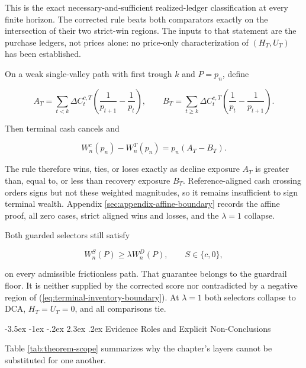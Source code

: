\documentclass[12pt,a4paper,oneside]{report}
\makeatletter
\renewcommand\section{\@startsection{section}{1}{\z@}%
  {-3.5ex \@plus -1ex \@minus -.2ex}%
  {2.3ex \@plus .2ex}%
  {\normalfont\fontsize{14}{17}\selectfont\bfseries}}
\makeatother
\begin{document}
This is the exact necessary-and-sufficient realized-ledger classification at
every finite horizon. The corrected rule beats both comparators exactly on the
intersection of their two strict-win regions. The inputs to that statement are
the purchase ledgers, not prices alone: no price-only characterization of
$(H_T,U_T)$ has been established.

On a weak single-valley path with first trough $k$ and $P=p_n$, define

\begin{equation}
  A_T=\sum_{t<k}\Delta C_t^{c,T}
      \left(\frac1{p_{t+1}}-\frac1{p_t}\right),
  \qquad
  B_T=\sum_{t\geq k}\Delta C_t^{c,T}
      \left(\frac1{p_t}-\frac1{p_{t+1}}\right).
  \label{eq:valley-exposures}
\end{equation}

Then terminal cash cancels and

\begin{equation}
  W_n^c(p_n)-W_n^T(p_n)=p_n(A_T-B_T).
  \label{eq:valley-terminal-boundary}
\end{equation}

The rule therefore wins, ties, or loses exactly as decline exposure $A_T$ is
greater than, equal to, or less than recovery exposure $B_T$. Reference-aligned
cash crossing orders signs but not these weighted magnitudes, so it remains
insufficient to sign terminal wealth. Appendix
\ref{sec:appendix-affine-boundary} records the affine proof, all zero cases,
strict aligned wins and losses, and the $\lambda=1$ collapse.

Both guarded selectors still satisfy

\begin{equation}
  W_n^S(P)\geq\lambda W_n^D(P),\qquad S\in\{c,0\},
  \label{eq:boundary-safety-reminder}
\end{equation}

on every admissible frictionless path. That guarantee belongs to the guardrail
floor. It is neither supplied by the corrected score nor contradicted by a
negative region of (\ref{eq:terminal-inventory-boundary}). At $\lambda=1$
both selectors collapse to DCA, $H_T=U_T=0$, and all comparisons tie.

\section{Evidence Roles and Explicit Non-Conclusions}
\label{sec:boundary-evidence-roles}

Table \ref{tab:theorem-scope} summarizes why the chapter's layers cannot be
substituted for one another.
\end{document}
